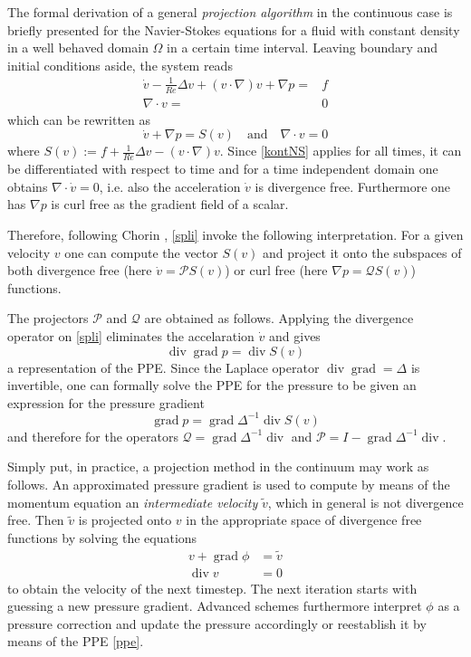 \documentclass[a4paper,10pt,BCOR=15mm]{scrbook}
\DeclareMathOperator{\dive}{div}
\DeclareMathOperator{\grad}{grad}
\providecommand{\andi}[0]{\quad \text{and} \quad}
\begin{document}
The formal derivation of a general \textit{projection algorithm} in the continuous case is briefly presented for the Navier-Stokes equations for a fluid with constant density in a well behaved domain $\Omega$ in a certain time interval. Leaving boundary and initial conditions aside, the system reads
\begin{align}
 \dot v - \frac{1}{Re} \Delta v +  (v \cdot \nabla) v+\nabla p =& f  \label{momeNS} \\
\nabla \cdot v =& 0  \label{kontNS}
\end{align}
which can be rewritten as 
\begin{equation}\label{spli}
 \dot v+\nabla p = S(v)  \andi \nabla \cdot v = 0
\end{equation}
where $S(v) := f+\frac{1}{Re} \Delta v -  (v \cdot \nabla) v$. Since \eqref{kontNS} applies for all times, it can be differentiated with respect to time and for a time independent domain one obtains $ \nabla \cdot \dot v  =0 $, i.e. also the acceleration $\dot v$ is divergence free. Furthermore one has $\nabla p$  is curl free as the gradient field of a scalar. 

Therefore, following Chorin \cite{chorin}, \eqref{spli} invoke the following interpretation. For a given velocity $v$ one can compute the vector $S(v)$ and project it onto the subspaces of both divergence free (here $\dot v = \mathscr P S(v)$) or curl free (here $\nabla p = \mathscr Q S(v)$) functions. 

The projectors $ \mathscr P$ and $ \mathscr Q $ are obtained as follows. Applying the divergence operator on \eqref{spli} eliminates the accelaration $\dot v$ and gives
\begin{equation} \label{ppe}
 \dive \grad p = \dive S(v)  
\end{equation}
a representation of the PPE. Since the Laplace operator $\dive \grad = \Delta$ is invertible, one can formally solve the PPE for the pressure to be given an expression for the pressure gradient
\begin{equation*}
 \grad p =\grad \Delta^{-1} \dive S(v)
\end{equation*}
and therefore for the operators $\mathscr Q = \grad  \Delta^{-1} \dive $ and $\mathscr P = I -\grad  \Delta^{-1} \dive $.

Simply put, in practice, a projection method in the continuum may work as follows. An approximated pressure gradient is used to compute by means of the momentum equation an \textit{intermediate velocity} $\tilde{v}$, which in general is not divergence free. Then $\tilde{v}$ is projected onto $v$ in the appropriate space of divergence free functions by solving the equations
\begin{align}
 v + \grad \phi &= \tilde v \label{fide} \\
\dive v &= 0
\end{align}
to obtain the velocity of the next timestep. The next iteration starts with guessing a new pressure gradient. Advanced schemes furthermore interpret $\phi$ as a pressure correction and update the pressure accordingly or reestablish it by means of the PPE \eqref{ppe}.
\end{document}
